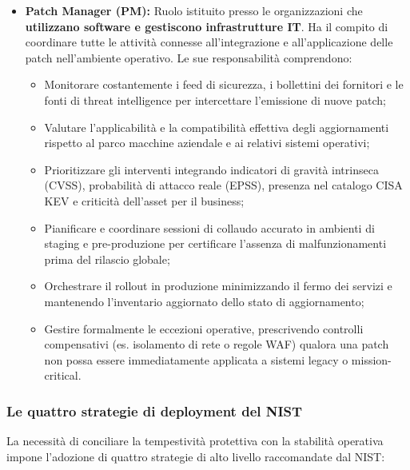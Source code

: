 \documentclass[../../main.tex]{subfiles}
\begin{document}
\begin{itemize}
    \item \textbf{Patch Manager (PM):} Ruolo istituito presso le organizzazioni che \textbf{utilizzano software e gestiscono infrastrutture IT}. Ha il compito di coordinare tutte le attività connesse all'integrazione e all'applicazione delle patch nell'ambiente operativo. Le sue responsabilità comprendono:
    \begin{itemize}
        \item Monitorare costantemente i feed di sicurezza, i bollettini dei fornitori e le fonti di threat intelligence per intercettare l'emissione di nuove patch;
        \item Valutare l'applicabilità e la compatibilità effettiva degli aggiornamenti rispetto al parco macchine aziendale e ai relativi sistemi operativi;
        \item Prioritizzare gli interventi integrando indicatori di gravità intrinseca (CVSS), probabilità di attacco reale (EPSS), presenza nel catalogo CISA KEV e criticità dell'asset per il business;
        \item Pianificare e coordinare sessioni di collaudo accurato in ambienti di staging e pre-produzione per certificare l'assenza di malfunzionamenti prima del rilascio globale;
        \item Orchestrare il rollout in produzione minimizzando il fermo dei servizi e mantenendo l'inventario aggiornato dello stato di aggiornamento;
        \item Gestire formalmente le eccezioni operative, prescrivendo controlli compensativi (es. isolamento di rete o regole WAF) qualora una patch non possa essere immediatamente applicata a sistemi legacy o mission-critical.
    \end{itemize}
\end{itemize}

\subsubsection{Le quattro strategie di deployment del NIST}
La necessità di conciliare la tempestività protettiva con la stabilità operativa impone l'adozione di quattro strategie di alto livello raccomandate dal NIST:
\end{document}
